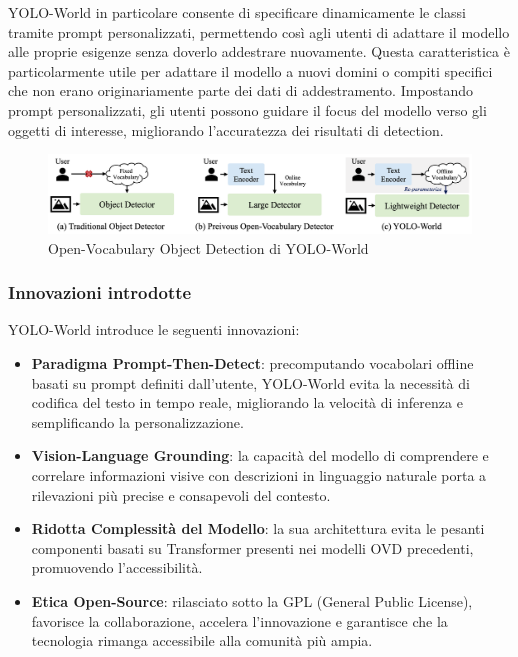 YOLO-World in particolare consente di specificare dinamicamente le classi tramite prompt personalizzati, permettendo così agli utenti di adattare il modello alle proprie esigenze  senza doverlo addestrare nuovamente. Questa caratteristica è particolarmente utile per adattare il modello a nuovi domini o compiti specifici che non erano originariamente parte dei dati di addestramento. Impostando prompt personalizzati, gli utenti possono guidare il focus del modello verso gli oggetti di interesse, migliorando l'accuratezza dei risultati di detection.

\vspace{1cm}

\begin{figure}[ht]
    \centering
    \includegraphics[width=1\textwidth]{files/capitoli/2-yolo/assets/yoloworld-ovd.png}
    \caption{\label{fig:yoloworld-ovd}Open-Vocabulary Object Detection di YOLO-World\cite{30}}
\end{figure}

\subsubsection{Innovazioni introdotte}
YOLO-World introduce le seguenti innovazioni:
\begin{itemize}
  \item \textbf{Paradigma Prompt-Then-Detect}: precomputando vocabolari offline basati su prompt definiti dall'utente, YOLO-World evita la necessità di codifica del testo in tempo reale, migliorando la velocità di inferenza e semplificando la personalizzazione.
  \item \textbf{Vision-Language Grounding}: la capacità del modello di comprendere e correlare informazioni visive con descrizioni in linguaggio naturale porta a rilevazioni più precise e consapevoli del contesto.
  \item \textbf{Ridotta Complessità del Modello}: la sua architettura evita le pesanti componenti basati su Transformer presenti nei modelli OVD precedenti, promuovendo l'accessibilità.
  \item \textbf{Etica Open-Source}: rilasciato sotto la GPL (General Public License), favorisce la collaborazione, accelera l'innovazione e garantisce che la tecnologia rimanga accessibile alla comunità più ampia.
\end{itemize}

